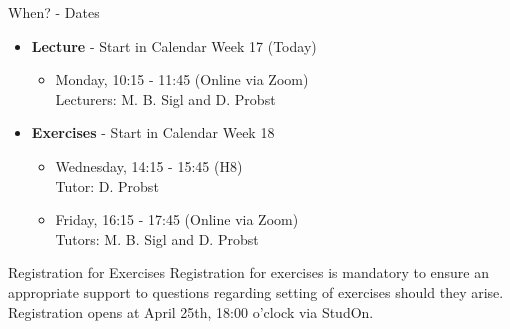 \begin{frame}{When? - Dates}
	\begin{itemize}
		\item \textbf{Lecture} - Start in Calendar Week 17 (Today)
		      \begin{itemize}
			      \item Monday, 10:15 - 11:45 (Online via Zoom) \\
			            {\color{gray}Lecturers: M. B. Sigl and D. Probst}
		      \end{itemize}
		\item \textbf{Exercises} - Start in Calendar Week 18
		      \begin{itemize}
			      \item Wednesday, 14:15 - 15:45 (H8) \\
			            {\color{gray}Tutor: D. Probst}
			      \item Friday, 16:15 - 17:45 (Online via Zoom) \\
			            {\color{gray}Tutors: M. B. Sigl and D. Probst}
		      \end{itemize}
	\end{itemize}

	\begin{block}{Registration for Exercises}
		Registration for exercises is mandatory to ensure an appropriate support to questions regarding setting of exercises should they arise.
			{\color{faured}Registration opens at April 25th, 18:00 o'clock via StudOn.}
	\end{block}
\end{frame}

